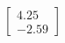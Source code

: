 \documentclass[preview]{standalone}
\begin{document}
\begin{align*}
\begin{bmatrix} 4.25 \\ -2.59 \end{bmatrix}
\end{align*}
\end{document}
